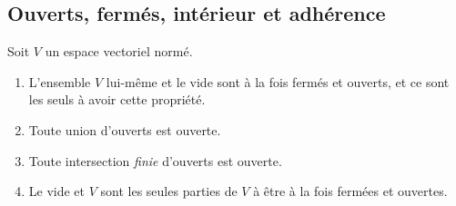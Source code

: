 \subsection{Ouverts, fermés, intérieur et adhérence}

\begin{proposition}		\label{PropTopologieAx}
	Soit $V$ un espace vectoriel normé.
	\begin{enumerate}
		\item
			L'ensemble $V$ lui-même et le vide sont à la fois fermés et ouverts, et ce sont les seuls à avoir cette propriété.
		\item
			Toute union d'ouverts est ouverte.
		\item
			Toute intersection \emph{finie} d'ouverts est ouverte.
		\item		\label{ItemPropTopologieAxiv}
			Le vide et $V$ sont les seules parties de $V$ à être à la fois fermées et ouvertes.
	\end{enumerate}
\end{proposition}

